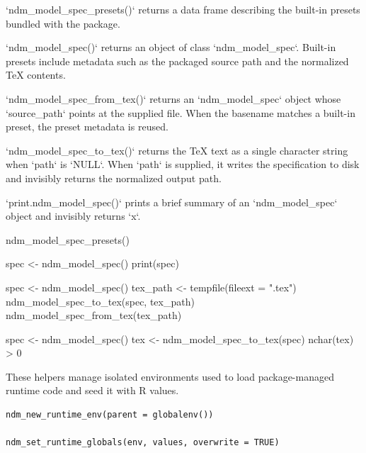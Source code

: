\documentclass[a4paper]{book}
\begin{document}
%
\begin{Value}
`ndm\_model\_spec\_presets()` returns a data frame describing the
built-in presets bundled with the package.

`ndm\_model\_spec()` returns an object of class `ndm\_model\_spec`.
Built-in presets include metadata such as the packaged source path and the
normalized TeX contents.

`ndm\_model\_spec\_from\_tex()` returns an `ndm\_model\_spec` object whose
`source\_path` points at the supplied file. When the basename matches a
built-in preset, the preset metadata is reused.

`ndm\_model\_spec\_to\_tex()` returns the TeX text as a single character
string when `path` is `NULL`. When `path` is supplied, it writes the
specification to disk and invisibly returns the normalized output path.

`print.ndm\_model\_spec()` prints a brief summary of an
`ndm\_model\_spec` object and invisibly returns `x`.
\end{Value}
%
\begin{Examples}
\begin{ExampleCode}
ndm_model_spec_presets()

spec <- ndm_model_spec()
print(spec)

spec <- ndm_model_spec()
tex_path <- tempfile(fileext = ".tex")
ndm_model_spec_to_tex(spec, tex_path)
ndm_model_spec_from_tex(tex_path)

spec <- ndm_model_spec()
tex <- ndm_model_spec_to_tex(spec)
nchar(tex) > 0

\end{ExampleCode}
\end{Examples}
%
\begin{Description}
These helpers manage isolated environments used to load package-managed
runtime code and seed it with R values.
\end{Description}
%
\begin{Usage}
\begin{verbatim}
ndm_new_runtime_env(parent = globalenv())

ndm_set_runtime_globals(env, values, overwrite = TRUE)
\end{verbatim}
\end{Usage}
%
\end{document}
